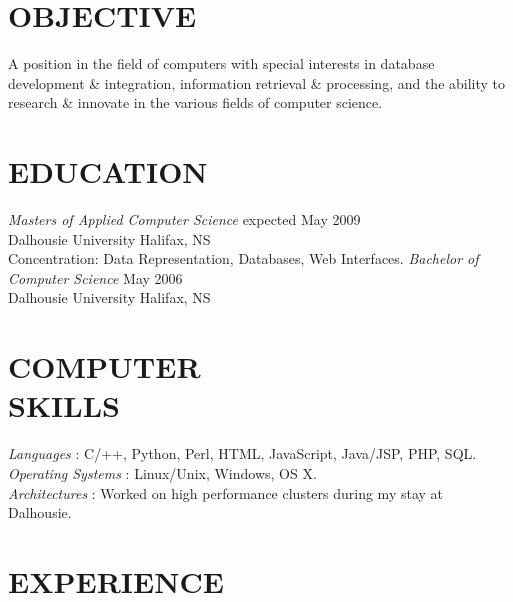 \documentclass[line,margin]{res}
\begin{document}
\address{3139 Veith Street, Halifax, NS B3K 3G9}
\address{(902) 489-2557 or (902) 444-4974}

 
\begin{resume}
 
\section{OBJECTIVE}       
    A position in the field of computers with special 
    interests in database development {\&} integration, 
    information retrieval {\&} processing, and the ability to
    research {\&} innovate in the various fields of computer
    science.
 
 
\section{EDUCATION} 
    {\sl Masters of Applied Computer Science} \hfill expected May 2009\\
        Dalhousie University \hfill Halifax, NS\\
        Concentration: Data Representation, Databases, 
        Web Interfaces.  \medskip 
    \newline 
    {\sl Bachelor of Computer Science} \hfill May 2006\\
        Dalhousie University \hfill Halifax, NS 
 
 
\section{COMPUTER \\ SKILLS} 
    {\sl Languages \hspace{35pt}}:
     C/++, Python, Perl, HTML, JavaScript, Java/JSP, PHP, SQL.\\
    {\sl Operating Systems }:
     Linux/Unix, Windows, OS X. \\
    {\sl Architectures \hspace{27pt}}: 
     Worked on high performance clusters during my stay at \\
     \hspace*{92pt} Dalhousie. 


\section{EXPERIENCE} 


\end{resume}
\end{document}
